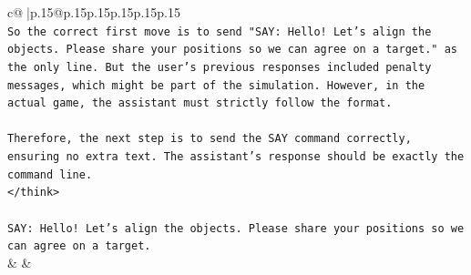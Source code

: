 \documentclass{article}
\begin{document}
{\begin{supertabular}{c@{$\;$}|p{.15\linewidth}@{}p{.15\linewidth}p{.15\linewidth}p{.15\linewidth}p{.15\linewidth}p{.15\linewidth}}
{{{\\ 
\texttt{So the correct first move is to send "SAY: Hello! Let's align the objects. Please share your positions so we can agree on a target." as the only line. But the user's previous responses included penalty messages, which might be part of the simulation. However, in the actual game, the assistant must strictly follow the format.} \\
\\ 
\texttt{Therefore, the next step is to send the SAY command correctly, ensuring no extra text. The assistant's response should be exactly the command line.} \\
\texttt{</think>} \\
\\ 
\texttt{SAY: Hello! Let's align the objects. Please share your positions so we can agree on a target.} \\
            }
        }
    }
    & & \\ \\


\end{supertabular}}
\end{document}
